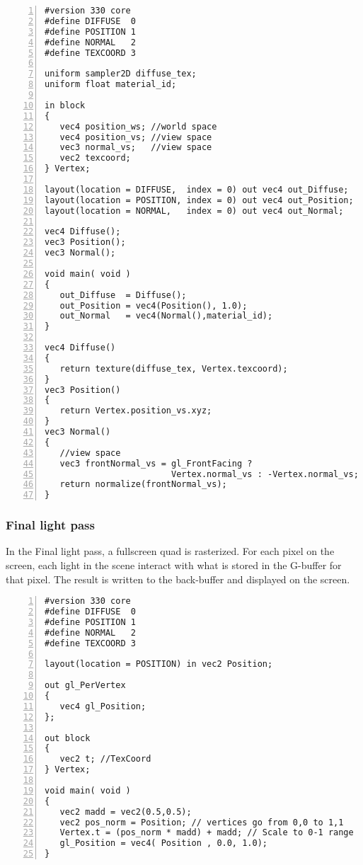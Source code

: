 \begin{Verbatim}[frame=single, numbers=left, label=G-buffer fragment shader]
#version 330 core
#define DIFFUSE  0
#define POSITION 1
#define NORMAL   2
#define TEXCOORD 3

uniform sampler2D diffuse_tex;
uniform float material_id;

in block
{
   vec4 position_ws; //world space
   vec4 position_vs; //view space
   vec3 normal_vs;   //view space
   vec2 texcoord;
} Vertex;

layout(location = DIFFUSE,  index = 0) out vec4 out_Diffuse;
layout(location = POSITION, index = 0) out vec4 out_Position;
layout(location = NORMAL,   index = 0) out vec4 out_Normal;

vec4 Diffuse();
vec3 Position();
vec3 Normal();

void main( void )
{
   out_Diffuse  = Diffuse();
   out_Position = vec4(Position(), 1.0);
   out_Normal   = vec4(Normal(),material_id);
}

vec4 Diffuse()
{
   return texture(diffuse_tex, Vertex.texcoord);
}
vec3 Position()
{
   return Vertex.position_vs.xyz;
}
vec3 Normal()
{
   //view space
   vec3 frontNormal_vs = gl_FrontFacing ? 
                         Vertex.normal_vs : -Vertex.normal_vs;
   return normalize(frontNormal_vs);
}
\end{Verbatim}

\subsubsection{Final light pass}
In the Final light pass, a fullscreen quad is rasterized. For each pixel on the screen, each light in the scene interact with what is stored in the G-buffer for that pixel. The result is written to the back-buffer and displayed on the screen.

\begin{Verbatim}[frame=single, numbers=left, label=Final vertex shader]
#version 330 core
#define DIFFUSE  0
#define POSITION 1
#define NORMAL   2
#define TEXCOORD 3

layout(location = POSITION) in vec2 Position;

out gl_PerVertex
{
   vec4 gl_Position;
};

out block
{
   vec2 t; //TexCoord
} Vertex;

void main( void )
{
   vec2 madd = vec2(0.5,0.5);
   vec2 pos_norm = Position; // vertices go from 0,0 to 1,1
   Vertex.t = (pos_norm * madd) + madd; // Scale to 0-1 range
   gl_Position = vec4( Position , 0.0, 1.0);
}
\end{Verbatim}

